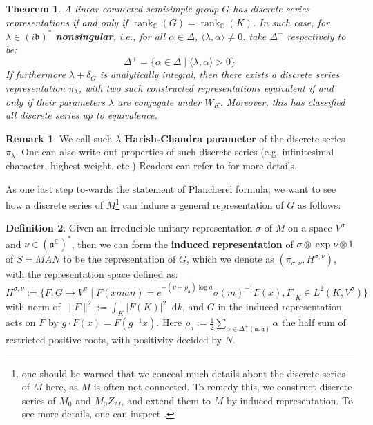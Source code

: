 \documentclass[11pt]{report}
\theoremstyle{definition}
\newtheorem{Def}{Definition}[chapter]
\newtheorem{Rmk}{Remark}[chapter]
\theoremstyle{plain}
\newtheorem{Theo}[Def]{Theorem}
\DeclareMathOperator{\rk}{rank}
\newcommand{\complex}{\mathbb{C}}
\newcommand{\brac}[1]{\langle #1 \rangle}
\newcommand{\norm}[1]{\lVert #1 \rVert}
\newcommand{\mass}[1]{\mathop{}\mathrm{d}{#1}}
\newcommand{\Lie}[1]{\mathfrak{#1}}
\begin{document}
\begin{Theo}\label{discrete series}
	\textnormal{\cite[Theorem~9.20 ,12.20 \& 12.21]{knapp2016}} A linear connected semisimple group $G$ has discrete series representations if and only if $\rk_\complex(G)=\rk_\complex(K)$. In such case, for $\lambda\in (i\Lie{b})^*$ \textbf{nonsingular}, i.e., for all $\alpha\in \Delta$, $\brac{\lambda, \alpha}\neq 0$. take $\Delta^+$ respectively to be:
	\begin{equation}
	\Delta^+=\{\alpha\in \Delta\mid \brac{\lambda, \alpha}>0\}
	\end{equation}
	If furthermore $\lambda+\delta_G$ is analytically integral, then there exists a discrete series representation $\pi_\lambda$, with two such constructed representations equivalent if and only if their parameters $\lambda$ are conjugate under $W_K$. Moreover, this has classified all discrete series up to equivalence.
\end{Theo}
\begin{Rmk}
	We call such $\lambda$ \textbf{Harish-Chandra parameter} of the discrete series $\pi_\lambda$. One can also write out properties of such discrete series (e.g. infinitesimal character, highest weight, etc.) Readers can refer to \cite[Theorem~9.22ff]{knapp2016} for more details.
\end{Rmk}
As one last step to-wards the statement of Plancherel formula, we want to see how a discrete series of $M$\footnote{one should be warned that we conceal much details about the discrete series of $M$ here, as $M$ is often not connected. To remedy this, we construct discrete series of $M_0$ and $M_0Z_M$, and extend them to $M$ by induced representation. To see more details, one can inspect \cite[Chapter~XII \S 8]{knapp2016}.} can induce a general representation of $G$ as follows:
\begin{Def}\label{principal series}
Given an irreducible unitary representation $\sigma$ of $M$ on a space $V^\sigma$ and $\nu\in (\Lie{a}^\complex)^*$, then we can form the \textbf{induced representation} of $\sigma\otimes \exp \nu\otimes 1$ of $S=MAN$ to be the representation of $G$, which we denote as $(\pi_{\sigma, \nu}, H^{\sigma, \nu})$, with the representation space defined as:
\begin{equation}
H^{\sigma, \nu}:=\Big\{F:G\to V^\sigma\mid F(xman)=e^{-(\nu+\rho_\Lie{a})\log a}\sigma(m)^{-1}F(x), F|_K\in L^2(K, V^\sigma)\Big\}
\end{equation}
with norm of $\norm{F}^2:=\int_K|F(K)|^2\mass{k}$, and $G$ in the induced representation acts on $F$ by $g\cdot F(x)=F(g^{-1}x)$. Here $\rho_\Lie{a}:=\frac{1}{2}\sum_{\alpha\in \Delta^+(\Lie{a}:\Lie{g})}\alpha$ the half sum of restricted positive roots, with positivity decided by $N$.
\end{Def} 
\end{document}
